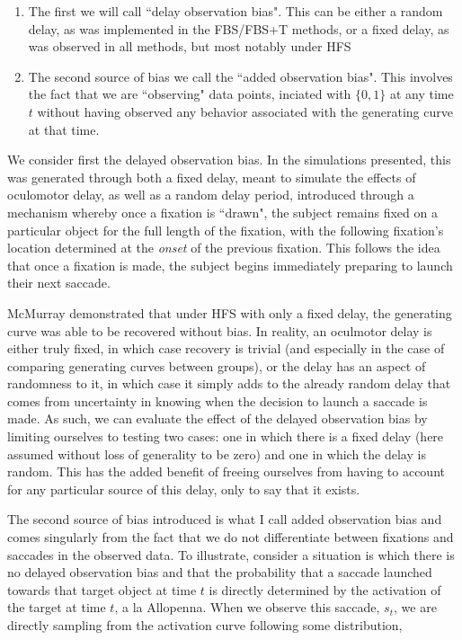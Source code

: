 \documentclass{article}
\begin{document}
\begin{singlespace}
\begin{enumerate}
\vspace{-3mm}
\item The first we will call ``delay observation bias". This can be either a random delay, as was implemented in the FBS/FBS+T methods, or a fixed delay, as was observed in all methods, but most notably under HFS
\item The second source of bias we call the ``added observation bias". This involves the fact that we are ``observing" data points, inciated with $\{0,1\}$ at any time $t$ without having observed any behavior associated with the generating curve at that time.
\end{enumerate}
\end{singlespace}

We consider first the delayed observation bias. In the simulations presented, this was generated through both a fixed delay, meant to simulate the effects of oculomotor delay, as well as a random delay period, introduced through a mechanism whereby once a fixation is ``drawn", the subject remains fixed on a particular object for the full length of the fixation, with the following fixation's location determined at the \textit{onset} of the previous fixation. This follows the idea that once a fixation is made, the subject begins immediately  preparing to launch their next saccade. 

McMurray demonstrated that under HFS with only a fixed delay, the generating curve was able to be recovered without bias. In reality, an oculmotor delay is either truly fixed, in which case recovery is trivial (and especially in the case of comparing generating curves between groups), or the delay has an aspect of randomness to it, in which case it simply adds to the already random delay that comes from uncertainty in knowing when the decision to launch a saccade is made. As such, we can evaluate the effect of the delayed observation bias by limiting ourselves to testing two cases: one in which there is a fixed delay (here assumed without loss of generality to be zero) and one in which the delay is random. This has the added benefit of freeing ourselves from having to account for any particular source of this delay, only to say that it exists.

The second source of bias introduced is what I call added observation bias and comes singularly from the fact that we do not differentiate between fixations and saccades in the observed data. To illustrate, consider a situation is which there is no delayed observation bias and that the probability that a saccade launched towards that target object at time $t$ is directly determined by the activation of the target at time $t$, a la Allopenna. When we observe this saccade, $s_t$, we are directly sampling from the activation curve following some distribution, 
\end{document}
